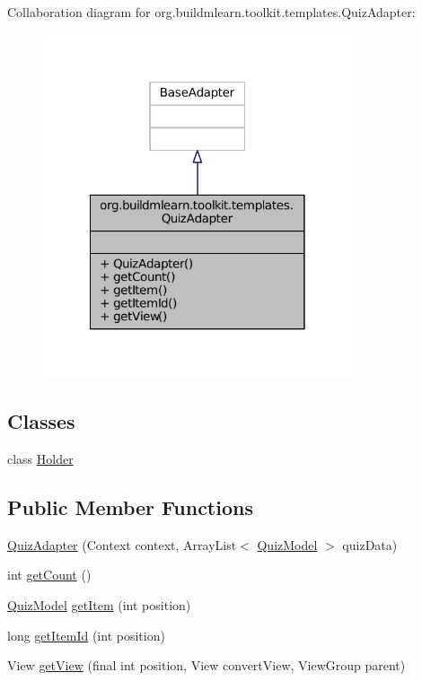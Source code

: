 Collaboration diagram for org.\-buildmlearn.\-toolkit.\-templates.\-Quiz\-Adapter\-:
\nopagebreak
\begin{figure}[H]
\begin{center}
\leavevmode
\includegraphics[width=258pt]{dd/d79/classorg_1_1buildmlearn_1_1toolkit_1_1templates_1_1QuizAdapter__coll__graph}
\end{center}
\end{figure}
\subsection*{Classes}
\begin{DoxyCompactItemize}
\item 
class \hyperlink{classorg_1_1buildmlearn_1_1toolkit_1_1templates_1_1QuizAdapter_1_1Holder}{Holder}
\end{DoxyCompactItemize}
\subsection*{Public Member Functions}
\begin{DoxyCompactItemize}
\item 
\hyperlink{classorg_1_1buildmlearn_1_1toolkit_1_1templates_1_1QuizAdapter_ad2908a773bc1d570de067fb651955ec8}{Quiz\-Adapter} (Context context, Array\-List$<$ \hyperlink{classorg_1_1buildmlearn_1_1toolkit_1_1templates_1_1QuizModel}{Quiz\-Model} $>$ quiz\-Data)
\item 
int \hyperlink{classorg_1_1buildmlearn_1_1toolkit_1_1templates_1_1QuizAdapter_a8c752789f5d0bb951476b84f10a047bc}{get\-Count} ()
\item 
\hyperlink{classorg_1_1buildmlearn_1_1toolkit_1_1templates_1_1QuizModel}{Quiz\-Model} \hyperlink{classorg_1_1buildmlearn_1_1toolkit_1_1templates_1_1QuizAdapter_add9307def1c611fefc1d255724488c1a}{get\-Item} (int position)
\item 
long \hyperlink{classorg_1_1buildmlearn_1_1toolkit_1_1templates_1_1QuizAdapter_a2480fce399e8ecbc5914f2770f74c04e}{get\-Item\-Id} (int position)
\item 
View \hyperlink{classorg_1_1buildmlearn_1_1toolkit_1_1templates_1_1QuizAdapter_a2d9da873e879211f8764af25b7ad4a16}{get\-View} (final int position, View convert\-View, View\-Group parent)
\end{DoxyCompactItemize}


